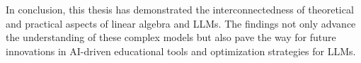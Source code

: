 In conclusion, this thesis has demonstrated the interconnectedness of theoretical and practical aspects of linear algebra and LLMs. The findings not only advance the understanding of these complex models but also pave the way for future innovations in AI-driven educational tools and optimization strategies for LLMs.
